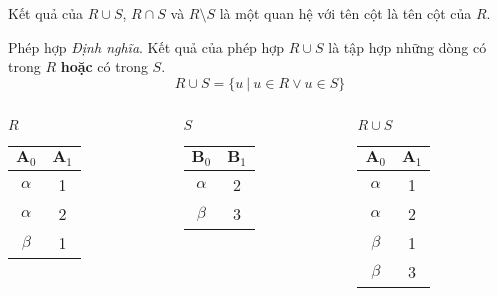 \documentclass[11pt]{beamer}
\begin{document}
  \begin{frame}
    Kết quả của $R \cup S$, $R \cap S$ và $R \setminus S$ là một quan hệ với tên cột là tên cột của $R$.
  \end{frame}
  \begin{frame}{Phép hợp}
    \textit{Định nghĩa}. Kết quả của phép hợp $R \cup S$ là tập hợp những dòng có trong $R$ \textbf{hoặc} có trong $S$.
    $$R \cup S = \{u\ |\ u \in R \vee u \in S\}$$
  \end{frame}
  \begin{frame}
    \begin{columns}[T]
      \begin{column}{0.3\textwidth}
        \centering $R$
        \medskip \\
        \begin{tabular}{||c|c||}
          \hline
          $\textbf{A}_0$ & $\textbf{A}_1$ \\[0.5ex] \hline\hline
          $\alpha$ & 1 \\ \hline
          $\alpha$ & 2 \\ \hline
          $\beta$ & 1 \\ \hline
        \end{tabular}
      \end{column}
      \begin{column}{0.3\textwidth}
        \centering $S$
        \medskip \\
        \begin{tabular}{||c|c||}
          \hline
          $\textbf{B}_0$ & $\textbf{B}_1$ \\[0.5ex] \hline\hline
          $\alpha$ & 2 \\ \hline
          $\beta$ & 3 \\ \hline
        \end{tabular}
      \end{column}
      \begin{column}{0.3\textwidth}
        \centering $R \cup S$
        \medskip \\
        \begin{tabular}{||c|c||}
          \hline
          $\textbf{A}_0$ & $\textbf{A}_1$ \\[0.5ex] \hline\hline
          $\alpha$ & 1 \\ \hline
          $\alpha$ & 2 \\ \hline
          $\beta$ & 1 \\ \hline
          $\beta$ & 3 \\ \hline
        \end{tabular}
      \end{column}
    \end{columns}
  \end{frame}
\end{document}
